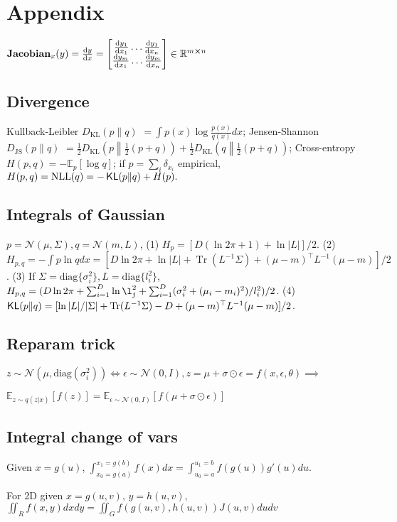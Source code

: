 \section{Appendix}

\makebox[0pt][l]{\smash{\text{\raisebox{-0.7em}{\tiny (numerator layout)}}}}\(\text{\textbf{Jacobian}}_x(y) = \derivative{y}{x} = \begin{bmatrix}
\derivative{y_1}{x_1} \dots \derivative{y_1}{x_n} \\
\makebox[0pt][l]{\smash{\text{\raisebox{1em}{\tiny{\;\;\dots}}}}}\derivative{y_m}{x_1} \dots \makebox[0pt][l]{\smash{\text{\raisebox{1em}{\tiny{\;\;\dots}}}}}\derivative{y_m}{x_n}
\end{bmatrix} \in \mathbb{R}^{m \cross n}\)

\subsection*{Divergence}
Kullback-Leibler $D_{\text{KL}}(p \| q) $ $= \int p(x) \log \frac{p(x)}{q(x)} dx
$; Jensen-Shannon $D_{\text{JS}}(p \| q) $ $= \frac{1}{2} D_{\text{KL}}\left(p \middle\| \frac{1}{2}(p + q)\right) + \frac{1}{2} D_{\text{KL}}\left(q \middle\| \frac{1}{2}(p + q)\right)$; Cross-entropy \(H(p, q)=-\mathbb{E}_{p}[\log q]\); if \(p=\sum_i\delta_{x_i}\) empirical, \(H(p, q) = \mathrm{NLL}(q) = - \operatorname{\mathsf{KL}}(p\|q) + H(p).\)

\subsection*{Integrals of Gaussian}
\(p=\mathcal{N}(\mu, \Sigma),q=\mathcal{N}(m, L)\), (1) \(H_p = [D (\ln 2 \pi+1) + \ln |L|] /2\).
(2) \(H_{p, q} = -\int p \ln q d x = [D \ln 2 \pi + \ln |L|+ \operatorname{Tr}(L^{-1}\Sigma) + (\mu-m)^{\top}L^{-1}(\mu-m)] /2\).
(3) If \(\Sigma = \text{diag}\{\sigma^2_i\},L = \text{diag}\{l^2_i\}\), \(H_{p, q} = (D\ln 2\pi + \sum_{i=1}^{D}\ln \l^2_j +  \sum_{i=1}^{D}(\sigma_i^2 + (\mu_i - m_i)^2) / l_i^2 )/2\).
(4) \(\operatorname{\mathsf{KL}}(p\|q) = [\ln |L|/|\Sigma|+ \operatorname{Tr}(L^{-1}\Sigma) - D + (\mu-m)^{\top}L^{-1}(\mu-m)] /2\).

\subsection*{Reparam trick}
\(z \sim \mathcal{N}(\mu, \text{diag}(\sigma_i^{2})) \Leftrightarrow \epsilon \sim \mathcal{N}(0,I), z=\mu+\sigma \odot \epsilon = f(x, \epsilon, \theta)\)\( \implies\)

\(\mathbb{E}_{z \sim q(z|x)}[f(z)] = \mathbb{E}_{\epsilon \sim \mathcal{N}(0, I)}[f(\mu + \sigma \odot \epsilon)]\)

\subsection*{Integral change of vars}

Given $x=g(u)$, $\int_{x_0=g(a)}^{x_1=g(b)} f(x) dx = \int_{u_0=a}^{u_1=b} f(g(u)) g'(u) du$.

For 2D given $x=g(u,v)$, $y=h(u,v)$, $\iint_{R} f(x,y) dxdy = \iint_{G} f(g(u,v), h(u,v)) J(u,v) dudv$
